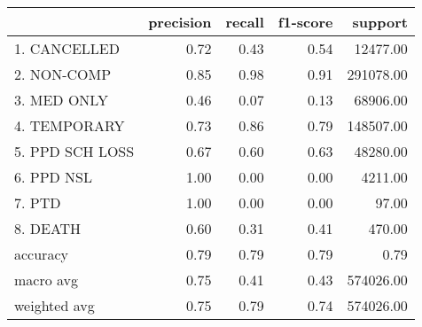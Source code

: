 \begin{tabular}{lrrrr}
\toprule
 & precision & recall & f1-score & support \\
\midrule
1. CANCELLED & 0.72 & 0.43 & 0.54 & 12477.00 \\
2. NON-COMP & 0.85 & 0.98 & 0.91 & 291078.00 \\
3. MED ONLY & 0.46 & 0.07 & 0.13 & 68906.00 \\
4. TEMPORARY & 0.73 & 0.86 & 0.79 & 148507.00 \\
5. PPD SCH LOSS & 0.67 & 0.60 & 0.63 & 48280.00 \\
6. PPD NSL & 1.00 & 0.00 & 0.00 & 4211.00 \\
7. PTD & 1.00 & 0.00 & 0.00 & 97.00 \\
8. DEATH & 0.60 & 0.31 & 0.41 & 470.00 \\
accuracy & 0.79 & 0.79 & 0.79 & 0.79 \\
macro avg & 0.75 & 0.41 & 0.43 & 574026.00 \\
weighted avg & 0.75 & 0.79 & 0.74 & 574026.00 \\
\bottomrule
\end{tabular}
